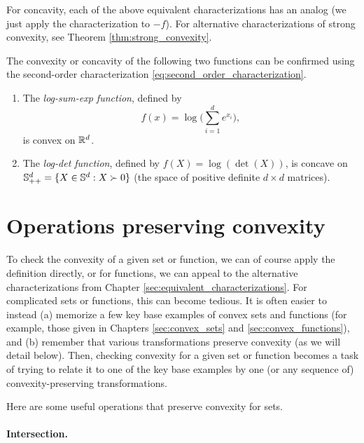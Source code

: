 \medskip

For concavity, each of the above equivalent characterizations has an analog
(we just apply the characterization to $-f$). For alternative
characterizations of strong convexity, see Theorem \ref{thm:strong_convexity}. 

\begin{Example} 
The convexity or concavity of the following two functions can be confirmed
using the second-order characterization
\eqref{eq:second_order_characterization}. 

\begin{enumerate}[label=\alph*., ref=\alph*]
\item The \emph{log-sum-exp function}, defined by 
  \[
  f(x) = \log\bigg( \sum_{i=1}^d e^{x_i} \bigg),
  \]
  is convex on $\mathbb{R}^d$.

\item {}
  The \emph{log-det function}, defined by $f(X) = \log(\det(X))$, is concave on
  $\mathbb{S}_{++}^d = \{X \in \mathbb{S}^d : X \succ 0\}$ (the space of positive definite $d
  \times d$ matrices).  
\end{enumerate}
\end{Example}

\section{Operations preserving convexity}
\label{sec:operations_preserving_convexity}

To check the convexity of a given set or function, we can of course apply the
definition directly, or for functions, we can appeal to the alternative
characterizations from Chapter \ref{sec:equivalent_characterizations}. For
complicated sets or functions, this can become tedious. It is often easier to
instead (a) memorize a few key base examples of convex sets and functions (for
example, those given in Chapters \ref{sec:convex_sets} and
\ref{sec:convex_functions}), and (b) remember that various transformations
preserve convexity (as we will detail below). Then, checking convexity for a
given set or function becomes a task of trying to relate it to one of the key
base examples by one (or any sequence of) convexity-preserving transformations.

Here are some useful operations that preserve convexity for sets.

\paragraph{Intersection.} 

